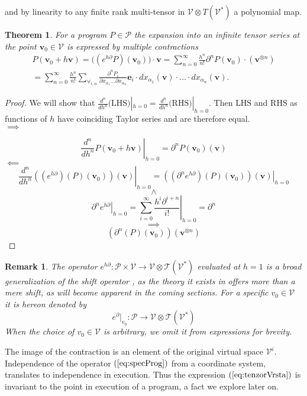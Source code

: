 \documentclass[preprint,12pt]{elsarticle}
\newcommand{\T}{\mathcal{T}}
\newcommand{\VV}{\mathcal{V}}
\newcommand{\e}{\mathbf{e}}
\newcommand{\vv}{\mathbf{v}}
\newcommand{\dP}{\mathcal{P}}
\newcommand{\D}{\partial}
\newtheorem{izrek}{Theorem}[section]
\newtheorem{opomba}{Remark}[section]
\begin{document}
and by linearity to any finite rank multi-tensor in $\VV\otimes T(\VV^*)$ a
polynomial map.
 
\begin{izrek}\label{izr:e^d}
	For a program $P\in\dP$  the expansion into an infinite tensor series
  at the point $\vv_0\in \VV$ is expressed by multiple contractions 
	\begin{multline}\label{eq:tenzorVrsta}
	P(\vv_0+h\vv) = \Big((e^{h\D}P)(\vv_0)\Big)\cdot\vv
  = \sum_{n=0}^\infty\frac{h^n}{n!}\D^nP(\vv_0)\cdot (\vv^{\otimes n})\\
  = \sum_{n=0}^\infty \frac{h^n}{n!}\sum_{\forall_{i,\alpha}}\frac{\partial^nP_i}{\partial
 		    x_{\alpha_1}\ldots \partial x_{\alpha_n}}\e_i\cdot
 		  dx_{\alpha_1}(\vv)\cdot\ldots \cdot dx_{\alpha_n}(\vv).
	\end{multline}
\end{izrek}
 
 \begin{proof}
We will show that $\frac{d^n}{dh^n}\text{(LHS)}|_{h=0}=\frac{d^n}{dh^n}\text{(RHS)}|_{h=0}$. Then $\text{LHS}$ and $\text{RHS}$ as functions
of $h$ have coinciding Taylor series and are therefore equal.\\
 $\implies$
 
 $$\left. \frac{d^n}{dh^n}P(\vv_0+h\vv)\right|_{h=0}=\D^n P(\vv_0)(\vv)$$
 $\impliedby$
 $$\left. \frac{d^n}{dh^n}\left((e^{h\D})(P)(\vv_0)\right)(\vv)\right|_{h=0}=
\left. \left((\D^n e^{h\D})(P)(\vv_0)\right)(\vv)\right|_{h=0}$$
 $$\land$$
 $$\left. \D^ne^{h\D}\right| _{h=0}=\left. \sum\limits_{i=0}^{\infty}\frac{h^i\D^{i+n}}{i!}\right|_{h=0}=\D^n$$
 $$\implies$$
 $$\left(\D^n(P)(\vv_0)\right)(\vv^{\otimes n})$$
 \end{proof}
 \begin{opomba}
 The operator $e^{h\D}:\dP\times \VV\to \VV\otimes \T(\VV^*)$ evaluated at $h=1$ is a broad generalization of the shift operator \cite{OpCalc}, as the theory it exists in offers more than a mere shift, as will become apparent in the coming sections.
 For a specific $v_0\in\VV$ it is hereon denoted by
 \begin{equation}
 e^\D\vert_{v_0}:\dP\to \VV\otimes \T(\VV^*)
 \end{equation}
 When the choice of $v_0\in\VV$ is arbitrary, we omit it from expressions for brevity.
 \end{opomba}
 
 The image of the contraction is an element of the original virtual space $\VV^i$. Independence of the operator $(\ref{eq:specProg})$ from a coordinate system, translates to independence in execution. Thus the expression $(\ref{eq:tenzorVrsta})$ is invariant to the point in execution of a program, a fact we explore later on.  
 
\end{document}
